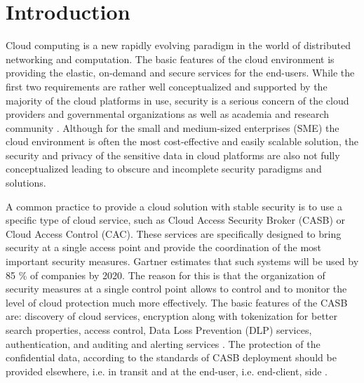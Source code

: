 \documentclass[twocolumn]{svjour3}          	%
\begin{document}

\section{Introduction}
\label{sec_intro}
Cloud computing is a new rapidly evolving paradigm in the world of distributed networking and computation. The basic features of the cloud environment is providing the elastic, on-demand and secure services for the end-users. While the first two requirements are rather well conceptualized and supported by the majority of the cloud platforms in use, security is a serious concern of the cloud providers and governmental organizations as well as academia and research community \cite{csa2016,higashi2015,gartner2015}. Although for the small and medium-sized enterprises (SME) the cloud environment is often the most cost-effective and easily scalable solution, the security and privacy of the sensitive data in cloud platforms are also not fully conceptualized leading to obscure and incomplete security paradigms and solutions.

A common practice to provide a cloud solution with stable security is to use a specific type of cloud service, such as Cloud Access Security Broker (CASB) or Cloud Access Control (CAC). These services are specifically designed to bring security at a single access point and provide the coordination of the most important security measures. Gartner \cite{skyhigh2015} estimates that such systems will be used by 85 \%  of companies by 2020. The reason for this is that the organization of security measures at a single control point allows to control and to monitor the level of cloud protection much more effectively. The basic features of the CASB are: discovery of cloud services, encryption along with tokenization for better search properties, access control, Data Loss Prevention (DLP) services, authentication, and auditing and alerting services \cite{lawson2015}. The protection of the confidential data, according to the standards of CASB deployment should be provided elsewhere, i.e. in transit and at the end-user, i.e. end-client, side \cite{campbell2015}.
\end{document}

